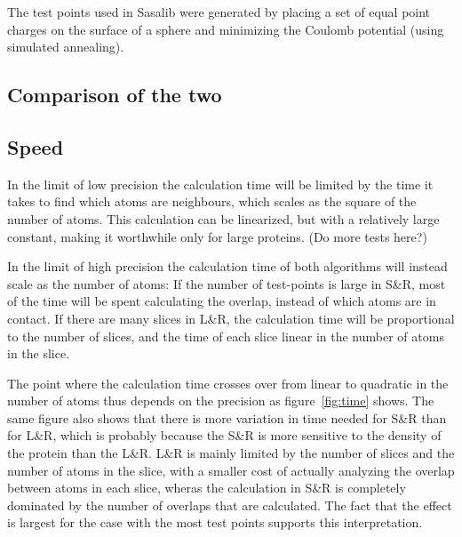 \documentclass[a4paper,11pt]{article}
\begin{document}
The test points used in Sasalib were generated by placing a set of
equal point charges on the surface of a sphere and minimizing the Coulomb
potential (using simulated annealing).

\subsection{Comparison of the two}

\subsection{Speed}

In the limit of low precision the calculation time will be limited by
the time it takes to find which atoms are neighbours, which scales as
the square of the number of atoms. This calculation can be linearized,
but with a relatively large constant, making it worthwhile only for
large proteins. (Do more tests here?)

In the limit of high precision the calculation time of both algorithms
will instead scale as the number of atoms: If the number of
test-points is large in S\&R, most of the time will be spent
calculating the overlap, instead of which atoms are in contact. If
there are many slices in L\&R, the calculation time will be
proportional to the number of slices, and the time of each
slice linear in the number of atoms in the slice. 

The point where the calculation time crosses over from linear to
quadratic in the number of atoms thus depends on the precision as
figure~\ref{fig:time} shows. The same figure also shows that there is
more variation in time needed for S\&R than for L\&R, which is
probably because the S\&R is more sensitive to the density of the
protein than the L\&R. L\&R is mainly limited by the number of slices
and the number of atoms in the slice, with a smaller cost of actually
analyzing the overlap between atoms in each slice, wheras the
calculation in S\&R is completely dominated by the number of overlaps
that are calculated. The fact that the effect is largest for the case
with the most test points supports this interpretation.
\end{document}
